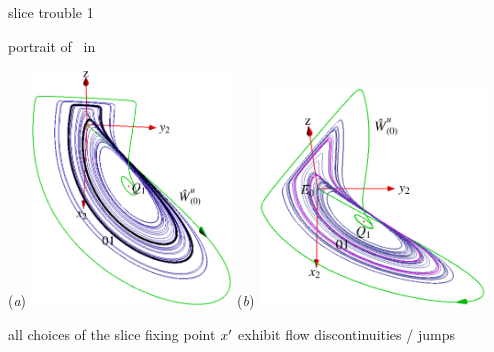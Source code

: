 \documentclass{beamer}
\begin{document}
\begin{frame}{slice trouble 1}
\begin{block}{portrait of \cLf\ in \reducedsp}
\begin{center}
(\textit{a})
  \includegraphics[width=0.40\textwidth,clip=true]
  {../../CLE/figs/CLEcoord245}
(\textit{b})
  \includegraphics[width=0.45\textwidth,clip=true]
  {../../figs/CLEperpReqb}
\end{center}
\end{block}
all choices of the slice fixing point ${x'}$
exhibit flow discontinuities / jumps
\end{frame}
\end{document}
